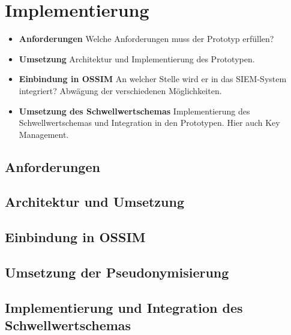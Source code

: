 \chapter{Implementierung}


\begin{itemize}
  \item \textbf{Anforderungen} Welche Anforderungen muss der Prototyp erfüllen?
  \item \textbf{Umsetzung} Architektur und Implementierung des Prototypen.
  \item \textbf{Einbindung in OSSIM} An welcher Stelle wird er in das SIEM-System integriert? Abwägung der verschiedenen Möglichkeiten.
  \item \textbf{Umsetzung des Schwellwertschemas} Implementierung des Schwellwertschemas und Integration in den Prototypen. Hier auch Key Management.
\end{itemize}


\label{cha_implementation}

\section{Anforderungen}

\section{Architektur und Umsetzung}

\section{Einbindung in OSSIM}

\section{Umsetzung der Pseudonymisierung}

\section{Implementierung und Integration des Schwellwertschemas}